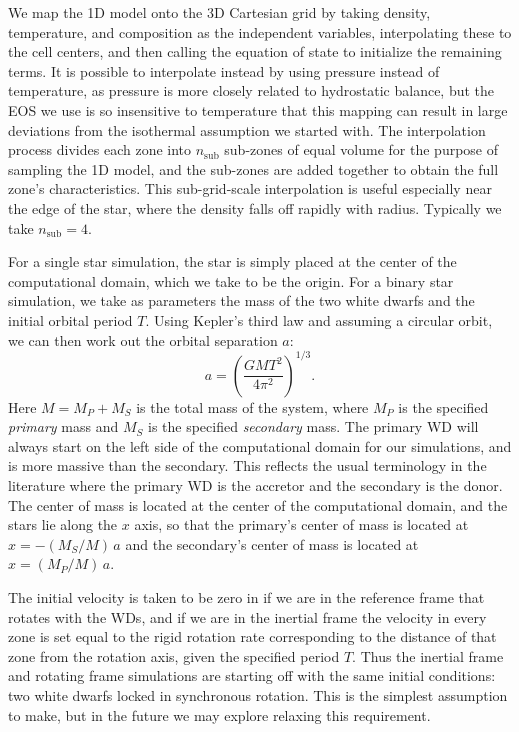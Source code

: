 \documentclass[iop]{../emulateapj}
\begin{document}
We map the 1D model onto the 3D Cartesian grid by taking density,
temperature, and composition as the independent variables,
interpolating these to the cell centers, and then calling the equation
of state to initialize the remaining terms. It is possible to interpolate
instead by using pressure instead of temperature, as pressure is more 
closely related to hydrostatic balance, but the EOS we use is so 
insensitive to temperature that this mapping can result in large 
deviations from the isothermal assumption we started with.  The 
interpolation process divides each zone into $n_{\text{sub}}$ 
sub-zones of equal volume for
the purpose of sampling the 1D model, and the sub-zones are added
together to obtain the full zone's characteristics. This
sub-grid-scale interpolation is useful especially near the edge of the star,
where the density falls off rapidly with radius. Typically we take 
$n_{\text{sub}} = 4$.

For a single star simulation, the star is simply placed at the center
of the computational domain, which we take to be the origin. For a
binary star simulation, we take as parameters the mass of the two
white dwarfs and the initial orbital period $T$. Using Kepler's third
law and assuming a circular orbit, we can then work out the orbital
separation $a$:
\begin{equation}
  a = \left(\frac{GM T^2}{4\pi^2}\right)^{1/3}.
\end{equation}
Here $M = M_P + M_S$ is the total mass of the system, where $M_P$ is
the specified \textit{primary} mass and $M_S$ is the specified
\textit{secondary} mass. The primary WD will always start on the left
side of the computational domain for our simulations, and is more
massive than the secondary. This reflects the usual terminology in the
literature where the primary WD is the accretor and the secondary is
the donor. The center of mass is located at the center of the
computational domain, and the stars lie along the $x$ axis, so that
the primary's center of mass is located at $x = -(M_S / M)\, a$ and
the secondary's center of mass is located at $x = (M_P / M)\, a$.

The initial velocity is taken to be zero in if we are in the reference
frame that rotates with the WDs, and if we are in the inertial frame
the velocity in every zone is set equal to the rigid rotation rate 
corresponding to the distance of that zone from the rotation axis, given
the specified period $T$. Thus the inertial frame and rotating frame 
simulations are starting off with the same initial conditions: two white 
dwarfs locked in synchronous rotation. This is the simplest assumption to 
make, but in the future we may explore relaxing this requirement.
\end{document}

